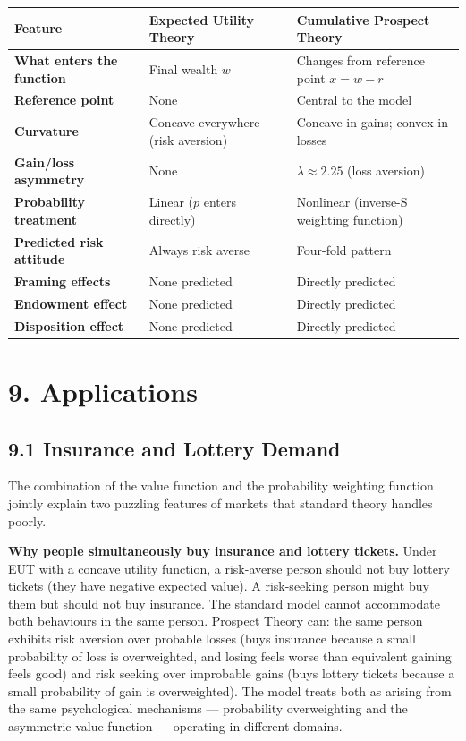 \documentclass[12pt, letterpaper]{article}
\begin{document}
\begin{table}[H]
\centering
\small
\begin{tabularx}{\linewidth}{lYY}
\toprule
Feature & Expected Utility Theory & Cumulative Prospect Theory \\
\midrule
\textbf{What enters the function} & Final wealth $w$ & Changes from reference point $x = w - r$ \\
\textbf{Reference point} & None & Central to the model \\
\textbf{Curvature} & Concave everywhere (risk aversion) & Concave in gains; convex in losses \\
\textbf{Gain/loss asymmetry} & None & $\lambda \approx 2.25$ (loss aversion) \\
\textbf{Probability treatment} & Linear ($p$ enters directly) & Nonlinear (inverse-S weighting function) \\
\textbf{Predicted risk attitude} & Always risk averse & Four-fold pattern \\
\textbf{Framing effects} & None predicted & Directly predicted \\
\textbf{Endowment effect} & None predicted & Directly predicted \\
\textbf{Disposition effect} & None predicted & Directly predicted \\
\bottomrule
\end{tabularx}
\end{table}


\medskip


\section{9. Applications}



\subsection{9.1 Insurance and Lottery Demand}


The combination of the value function and the probability weighting function jointly explain two puzzling features of markets that standard theory handles poorly.

\textbf{Why people simultaneously buy insurance and lottery tickets.} Under EUT with a concave utility function, a risk-averse person should not buy lottery tickets (they have negative expected value). A risk-seeking person might buy them but should not buy insurance. The standard model cannot accommodate both behaviours in the same person. Prospect Theory can: the same person exhibits risk aversion over probable losses (buys insurance because a small probability of loss is overweighted, and losing feels worse than equivalent gaining feels good) and risk seeking over improbable gains (buys lottery tickets because a small probability of gain is overweighted). The model treats both as arising from the same psychological mechanisms --- probability overweighting and the asymmetric value function --- operating in different domains.
\end{document}
